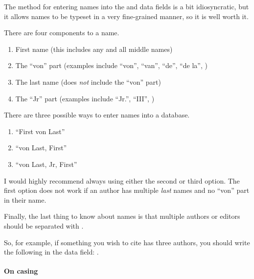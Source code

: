 The method for entering names into the  and  data fields is a bit idiosyncratic, but it allows names to be typeset in a very fine-grained manner, so it is well worth it.

There are four components to a name.

\begin{enumerate}[label={(\roman*)}]

	\item{First name (this includes any and all middle names)}
	
	\item{The ``von'' part (examples include ``von'', ``van'', ``de'', ``de la'', \ETC)}
	
	\item{The last name (does \emph{not} include the ``von'' part)}
	
	\item{The ``Jr'' part (examples include ``Jr.'', ``III'', \ETC)}

\end{enumerate}

There are three possible ways to enter names into a  database.

\begin{enumerate}[label={(\roman*)}]

	\item{``First von Last''}
	
	\item{``von Last, First''}
	
	\item{``von Last, Jr, First''}

\end{enumerate}

I would highly recommend always using either the second or third option.
The first option does not work if an author has multiple \emph{last} names and no ``von'' part in their name.

Finally, the last thing to know about names is that multiple authors or editors should be separated with .

So, for example, if something you wish to cite has three authors, you should write the following in the  data field: .

\paragraph{On casing}

